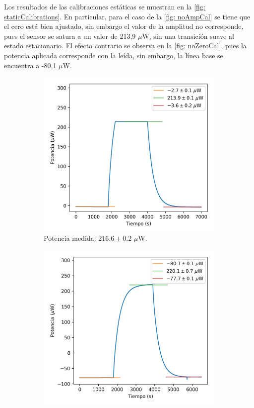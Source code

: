 	Los resultados de las calibraciones estáticas se muestran en la \autoref{fig: staticCalibrations}. En particular, para el caso de la \autoref{fig: noAmpCal} se tiene que el cero está bien ajustado, sin embargo el valor de la amplitud no corresponde, pues el sensor se satura a un valor de 213,9 $\mu$W, sin una transición suave al estado estacionario. El efecto contrario se observa en la \autoref{fig: noZeroCal}, pues la potencia aplicada corresponde con la leída, sin embargo, la línea base se encuentra a -80,1 $\mu$W.
	\begin{figure}[h]
		\centering
		\begin{subfigure}{0.45\linewidth}
			\includegraphics[width=\linewidth]{../Data/ElectricalCalibrations/Static/Calibration1}
			\caption{Potencia medida: $216.6 \pm 0.2$ $\mu$W.}
			\label{fig: noAmpCal}
		\end{subfigure}
		\begin{subfigure}{0.45\linewidth}
			\includegraphics[width=\linewidth]{../Data/ElectricalCalibrations/Static/Calibration0}

\end{subfigure}
\end{figure}
